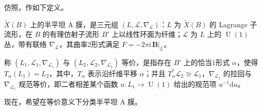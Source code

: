 仿照，作如下定义。

\begin{definition}\label{def:6.66}
$\check X(B)$ 上的半平坦 A 膜，是三元组 $(L,\mathcal L,\nabla_{\mathcal L})$：$L$ 为 $\check X(B)$ 的 Lagrange 子流形，在 $B$ 的有理仿射子流形 $B'$ 上以线性环面为纤维；$\mathcal L$ 为 $L$ 上的 $\operatorname{U}(1)$ 丛，带有联络 $\nabla_{\mathcal L}$，其曲率2形式满足 $F=-2\pi\mathrm i\,\mathbf B|_L$。

称 $(L_1,\mathcal L_1,\nabla_{\mathcal L_1})$ 与 $(L_2,\mathcal L_2,\nabla_{\mathcal L_2})$ 等价，是指存在 $B'$ 上的恰当1形式 $\alpha$，使得 $T_\alpha(L_1)=L_2$，其中，$T_\alpha$ 表示沿纤维平移 $\alpha$；并且 $T_\alpha^*\mathcal L_2\cong\mathcal L_1$，$\nabla_{\mathcal L_2}$ 的拉回与 $\nabla_{\mathcal L_1}$ 规范等价，即二者相差某个函数 $u\colon L_1\to\operatorname{U}(1)$ 给出的规范项 $u^{-1}\mathrm du$。
\end{definition}

现在，希望在等价意义下分类半平坦 A 膜。

